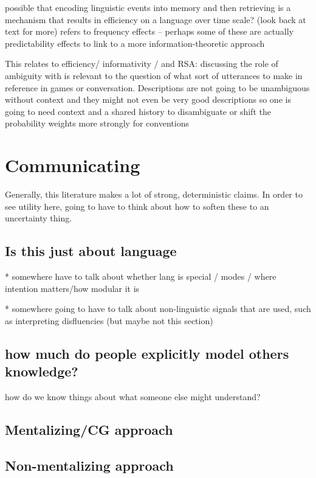 \documentclass[]{article}
\begin{document}
\cite{bybee2006} possible that encoding linguistic events into memory and then retrieving is a mechanism that results in efficiency on a language over time scale? (look back at text for more) 
refers to frequency effects -- perhaps some of these are actually predictability effects to link to a more information-theoretic approach 

This relates to efficiency/ informativity / and RSA: \cite{piantadosi2012} discussing the role of ambiguity with is relevant to the question of what sort of utterances to make in reference in games or conversation. Descriptions are not going to be unambiguous without context and they might not even be very good descriptions so one is going to need context and a shared history to disambiguate or shift the probability weights more strongly for conventions

\section{Communicating}

Generally, this literature makes a lot of strong, deterministic claims. In order to see utility here, going to have to think about how to soften these to an uncertainty thing.

\subsection{Is this just about language}
* somewhere have to talk about whether lang is special / modes / where intention matters/how modular it is

* somewhere going to have to talk about non-linguistic signals that are used, such as interpreting disfluencies (but maybe not this section) 


\subsection{how much do people explicitly model others knowledge?}
how do we know things about what someone else might understand?

\subsection{Mentalizing/CG approach}

\subsection{Non-mentalizing approach}
\end{document}
